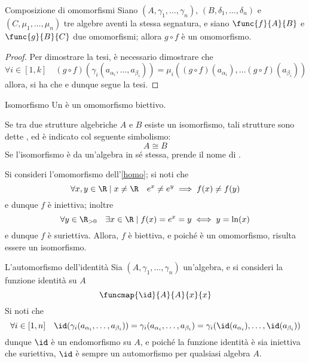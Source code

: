 \documentclass[a4paper, 12pt]{report}
\begin{document}
    \begin{framedprop}[label={comp homo}]{Composizione di omomorfismi}
        Siano $(A, \gamma_1, \ldots, \gamma_n)$, $(B, \delta_1, \ldots, \delta_n)$ e $(C, \mu_1, \ldots, \mu_n)$ tre algebre aventi la stessa segnatura, e siano $\func{f}{A}{B}$ e $\func{g}{B}{C}$ due omomorfismi; allora $g \circ f$ è un omomorfismo.
    \end{framedprop}

    \begin{proof}
        Per dimostrare la tesi, è necessario dimostrare che $$\forall i \in [1, k] \quad (g \circ f)(\gamma_i(a_{\alpha_i}, \ldots, a_{\beta_i})) = \mu_i((g \circ f)(a_{\alpha_i}), \ldots (g \circ f)(a_{\beta_i}))$$ allora, si ha che  e dunque segue la tesi.
    \end{proof}

    \begin{frameddefn}{Isomorfismo}
        Un  è un omomorfismo biettivo.

        Se tra due strutture algebriche $A$ e $B$ esiste un isomorfismo, tali strutture sono dette , ed è indicato col seguente simbolismo: $$A \cong B$$ Se l'isomorfismo è da un'algebra in sé stessa, prende il nome di .
    \end{frameddefn}

    \begin{example}[Isomorfismi]
        Si consideri l'omomorfismo dell'\cref{homo}; si noti che $$\forall x, y \in \R \mid x \neq \R \quad e^x \neq e^y \implies f(x) \neq f(y)$$ e dunque $f$ è iniettiva; inoltre $$\forall y \in \R_{> 0} \quad \exists x \in \R \mid f(x) = e^x = y \iff y = \ln(x)$$ e dunque $f$ è suriettiva. Allora, $f$ è biettiva, e poiché è un omomorfismo, risulta essere un isomorfismo.
    \end{example}

    \begin{framedobs}[label={iden auto}]{L'automorfismo dell'identità}
        Sia $(A, \gamma_1, \ldots, \gamma_n)$ un'algebra, e si consideri la funzione identità su $A$ $$\funcmap{\id}{A}{A}{x}{x}$$ Si noti che $$\forall i \in [1, n] \quad \id(\gamma_i(a_{\alpha_i}, \ldots, a_{\beta_i})) = \gamma_i(a_{\alpha_i}, \ldots, a_{\beta_i}) = \gamma_i(\id(a_{\alpha_i}), \ldots, \id(a_{\beta_i}))$$ dunque $\id$ è un endomorfismo su $A$, e poiché la funzione identità è sia iniettiva che suriettiva, $\id$ è sempre un automorfismo per qualsiasi algebra $A$.
    \end{framedobs}
\end{document}
